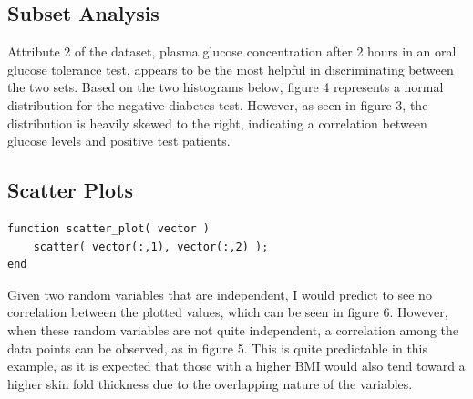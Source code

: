 \documentclass[12pt, letterpaper]{report}
\begin{document}
\subsection{Subset Analysis}

Attribute 2 of the dataset, plasma glucose concentration after 2 hours in an oral glucose tolerance test, appears to be the most helpful in discriminating between the two sets. Based on the two histograms below, figure 4 represents a normal distribution for the negative diabetes test. However, as seen in figure 3, the distribution is heavily skewed to the right, indicating a correlation between glucose levels and positive test patients.

\begin{figure}[H]
	\captionsetup[subfigure]{labelformat=empty}
	\centering
	\qquad
	\label{fig:example}
\end{figure}

\subsection{Scatter Plots}

\begin{verbatim}
function scatter_plot( vector )
    scatter( vector(:,1), vector(:,2) );
end
\end{verbatim}

Given two random variables that are independent, I would predict to see no correlation between the plotted values, which can be seen in figure 6. However, when these random variables are not quite independent, a correlation among the data points can be observed, as in figure 5. This is quite predictable in this example, as it is expected that those with a higher BMI would also tend toward a higher skin fold thickness due to the overlapping nature of the variables.
\end{document}
